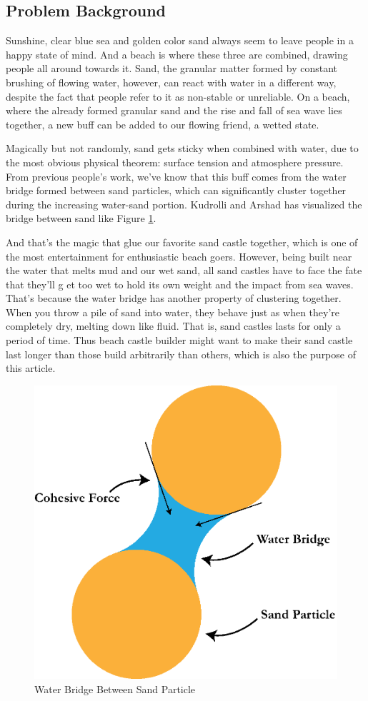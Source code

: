 \documentclass[12pt]{article}
\begin{document}
\subsection{Problem Background}
\par
Sunshine, clear blue sea and golden color sand always seem to leave people in a happy state of mind.
And a beach is where these three are combined, drawing people all around towards it. Sand, the granular matter formed by constant brushing of flowing water, however, can react with water in a different way, despite the fact that people refer to it as non-stable or unreliable. On a beach, where the already formed granular sand and the rise and fall of sea wave lies together, a new buff can be added to our flowing friend, a wetted state.
\par
Magically but not randomly, sand gets sticky when combined with water, due to the most obvious physical theorem: surface tension and atmosphere pressure. From previous people's work, we've know that this buff comes from the water bridge formed between sand particles, which can significantly cluster together during the increasing water-sand portion\autocite{pakpour2012construct,mitarai2006wet,kudrolli2008sticky}. Kudrolli and Arshad has visualized the bridge between sand like Figure \ref{fig:water_bridge}.
\par
And that's the magic that glue our favorite sand castle together, which is one of the most entertainment for enthusiastic beach goers. However, being built near the water that melts mud and our wet sand, all sand castles have to face the fate that they'll g et too wet to hold its own weight and the impact from sea waves. That's because the water bridge has another property of clustering together\autocite{kudrolli2008sticky}. When you throw a pile of sand into water, they behave just as when they're completely dry, melting down like fluid. That is, sand castles lasts for only a period of time. Thus beach castle builder might want to make their sand castle last longer than those build arbitrarily than others, which is also the purpose of this article.

\begin{figure}
    \centering
    \includegraphics[width=0.5\linewidth]{water_bridge.eps}
    \caption{Water Bridge Between Sand Particle}
    \label{fig:water_bridge}
\end{figure}
\end{document}
